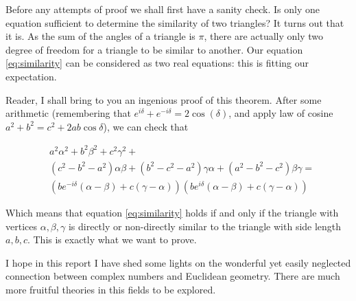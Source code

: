 \documentclass[12pt, a4paper]{article}
\theoremstyle{definition}
\theoremstyle{remark}
\begin{document}
Before any attempts of proof we shall first have a sanity check. Is only one equation sufficient to determine the similarity of two triangles? It turns out that it is.
As the sum of the angles of a triangle is $\pi$, there are actually only two degree of freedom for a triangle to be similar to another. Our equation \ref{eq:similarity} can be considered as two real equations: this is fitting our expectation.  

Reader, I shall bring to you an ingenious proof of this theorem. After some arithmetic (remembering that $e^{i \delta} + e^{-i \delta} = 2\cos(\delta)$, and apply law of cosine $a^2 + b^2 = c^2 + 2ab\cos{\delta}$), we can check that 

\begin{equation}
	\begin{split}
		&a^2 \alpha^2 + b^2 \beta^2 + c^2 \gamma^2 + \\
		&(c^2-b^2-a^2)\alpha \beta + (b^2-c^2-a^2)\gamma \alpha + (a^2 - b^2 - c^2) \beta \gamma = \\ 
		&\left(be^{-i \delta}(\alpha - \beta) + c(\gamma - \alpha)\right)
		\left(be^{i \delta}(\alpha - \beta) + c(\gamma - \alpha) \right)
	\end{split}
\end{equation}

Which means that equation \ref{eq:similarity} holds if and only if the triangle with vertices $\alpha, \beta, \gamma$ is directly or non-directly similar to the triangle with side length $a, b, c$. This is exactly what we want to prove.

I hope in this report I have shed some lights on the wonderful yet easily neglected connection between complex numbers and Euclidean geometry.
There are much more fruitful theories in this fields to be explored.

\printbibliography
\end{document}
